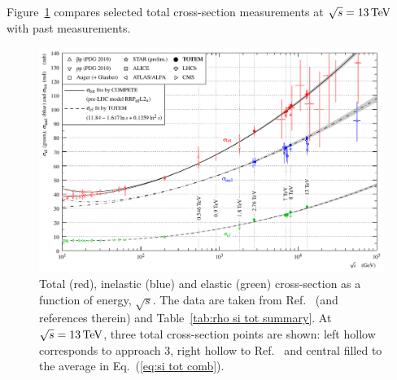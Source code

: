Figure~\ref{fig:si tot inel el} compares selected total cross-section measurements at $\sqrt s = 13\,{\rm TeV}$ with past measurements.


\begin{figure}
\begin{center}
\includegraphics{fig/sigma_tot_el_inel_vs_s.pdf}
\caption{%
Total (red), inelastic (blue) and elastic (green) cross-section as a function of energy, $\sqrt s$. The data are taken from Ref.~\cite{totem-13tev-90m} (and references therein) and Table~\ref{tab:rho si tot summary}. At $\sqrt s = 13\,{\rm TeV}$, three total cross-section points are shown: left hollow corresponds to approach 3, right hollow to Ref.~\cite{totem-13tev-90m} and central filled to the average in Eq.~(\ref{eq:si tot comb}).
}
\label{fig:si tot inel el}
\end{center}
\end{figure}
